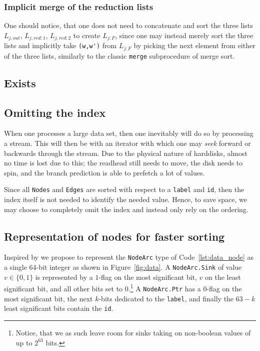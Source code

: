 
\subsubsection{Implicit merge of the reduction lists}
One should notice, that one does not need to concatenate and sort the three
lists $L_{j,\mathit{out}}$, $L_{j,\mathit{red:}1}$, $L_{j,\mathit{red:}2}$ to
create $L_{j:F}$, since one may instead merely sort the three lists and
implicitly take \lstinline{(w,w')} from $L_{j:F}$ by picking the next element
from either of the three lists, similarly to the classic \lstinline{merge}
subprocedure of merge sort.

\subsection{Exists}


\subsection{Omitting the index} \label{sec:optimisations__no_index}
When one processes a large data set, then one inevitably will do so by
processing a stream. This will then be with an iterator with which one may
\emph{seek} forward or backwards through the stream. Due to the physical nature
of harddisks, almost no time is lost due to this; the readhead still needs to
move, the disk needs to spin, and the branch prediction is able to prefetch a
lot of values.

Since all \lstinline{Nodes} and \lstinline{Edges} are sorted with respect to a
\lstinline{label} and \lstinline{id}, then the index itself is not needed to
identify the needed value. Hence, to save space, we may choose to completely
omit the index and instead only rely on the ordering.

\subsection{Representation of nodes for faster sorting}
Inspired by \cite{Dijk16} we propose to represent the \lstinline{NodeArc} type
of Code~\ref{lst:data_node} as a single 64-bit integer as shown in
Figure~\ref{fig:data}. A \lstinline{NodeArc.Sink} of value $v \in \{0,1\}$ is
represented by a $1$-flag on the most significant bit, $v$ on the least
significant bit, and all other bits set to $0$.\footnote{Notice, that we as such
  leave room for sinks taking on non-boolean values of up to $2^{63}$ bits.} A
\lstinline{NodeArc.Ptr} has a $0$-flag on the most significant bit, the next
$k$-bits dedicated to the \lstinline{label}, and finally the $63-k$ least
significant bits contain the \lstinline{id}.

